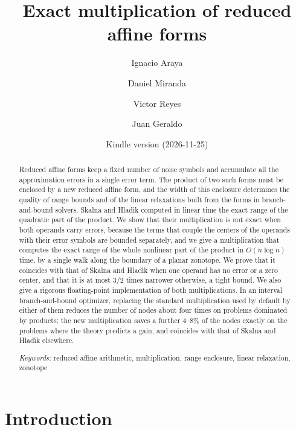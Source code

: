 \documentclass[10pt]{article}
\title{Exact multiplication of reduced affine forms}
\author{Ignacio Araya \and Daniel Miranda \and Victor Reyes \and Juan Geraldo}
\date{\small Kindle version \DIFdelbegin \DIFdel{v23 }\DIFdelend \DIFaddbegin \DIFadd{v24 }\DIFaddend (2026-11-25)}
\theoremstyle{definition}
\begin{document}
\maketitle

\begin{abstract}
Reduced affine forms keep a fixed number of noise symbols and accumulate all the approximation errors in a single error term. The product of two such forms must be enclosed by a new reduced affine form, and the width of this enclosure determines the quality of range bounds and of the linear relaxations built from the forms in branch-and-bound solvers. Skalna and Hlad\'{\i}k computed in linear time the exact range of the quadratic part of the product. We show that their multiplication is not exact when both operands carry errors, because the terms that couple the centers of the operands with their error symbols are bounded separately, and we give a multiplication that computes the exact range of the whole nonlinear part of the product in $O(n\log n)$ time, by a single walk along the boundary of a planar zonotope. We prove that it coincides with that of Skalna and Hlad\'{\i}k when one operand has no error or a zero center, and that it is at most $3/2$ times narrower otherwise, a tight bound. We also give a rigorous floating-point implementation of both multiplications. In an interval branch-and-bound optimizer, replacing the standard multiplication used by default by either of them reduces the number of nodes about four times on problems dominated by products; the new multiplication saves a further 4--8\% of the nodes exactly on the problems where the theory predicts a gain, and coincides with that of Skalna and Hlad\'{\i}k elsewhere.

\medskip\noindent
\textit{Keywords:} reduced affine arithmetic, multiplication, range enclosure, linear relaxation, zonotope
\end{abstract}

\section{Introduction}
\end{document}
